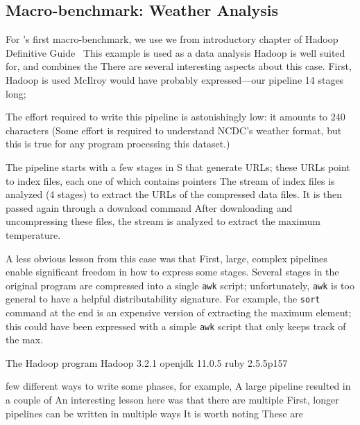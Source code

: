 \documentclass[sigplan,10pt,review,anonymous]{acmart}
\newcommand{\ttt}[1]{\texttt{\small #1}}
\newcommand{\cn}[1]{\mbox{\textcircled{\footnotesize #1}}}
\newcommand{\sta}{\cn{\textsc{S}}\xspace}
\begin{document}
\subsection{Macro-benchmark: Weather Analysis}
\label{macro1}

For \sys's first macro-benchmark, we use we
from introductory chapter of Hadoop Definitive Guide~\cite[Chapter 2]{hadoop:15}
This example is used as a data analysis Hadoop is well suited for, and combines the 
There are several interesting aspects about this case.
First, Hadoop is used 
McIlroy would have probably expressed---our pipeline 
14 stages long;

The effort required to write this pipeline is astonishingly low:
  it amounts to 240 characters 
(Some effort is required to understand NCDC's weather format, but this is true for any program processing this dataset.)

The pipeline starts with a few stages in \sta  that generate URLs;
  these URLs point to index files, each one of which contains pointers 
The stream of index files is analyzed (4 stages) to extract the URLs of the compressed data files.
It is then passed again through a download command
After downloading and uncompressing these files, the stream is analyzed to extract the maximum temperature.

A less obvious lesson from this case was that  
First, large, complex pipelines enable significant freedom in how to express some stages.
Several stages in the original program are compressed into a single \ttt{awk} script;
  unfortunately, \ttt{awk} is too general to have a helpful distributability signature.
For example, the \ttt{sort} command at the end is an expensive version of extracting the maximum element;
  this could have been expressed with a simple \ttt{awk} script that only keeps track of the max.

The Hadoop program 
Hadoop 3.2.1
openjdk 11.0.5
ruby 2.5.5p157

few different ways to write some phases, 
  for example, 
A large pipeline resulted in a couple of 
An interesting lesson here was that there are multiple
First, longer pipelines can be written in multiple ways
It is worth noting
These are 

\end{document}
